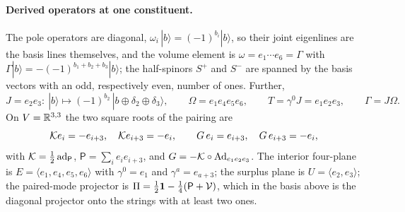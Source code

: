 \paragraph{Derived operators at one constituent.} The pole operators are diagonal, $\omega_i\,|b\rangle=(-1)^{b_i}|b\rangle$, so their joint eigenlines are the basis lines
themselves, and the volume element is $\omega=e_1\cdots e_6=\Gamma$ with $\Gamma|b\rangle=-(-1)^{b_1+b_2+b_3}|b\rangle$; the half-spinors $S^+$ and $S^-$ are spanned by the basis
vectors with an odd, respectively even, number of ones. Further,
\[
J=e_2e_3:\ |b\rangle\mapsto(-1)^{b_2}\,|b\oplus\delta_2\oplus\delta_3\rangle,\qquad \Omega=e_1e_4e_5e_6,\qquad T=\gamma^0J=e_1e_2e_3,\qquad \Gamma=J\Omega .
\]
On $V=\mathbb{R}^{3,3}$ the two square roots of the pairing are
\[
\mathcal K e_i=-e_{i+3},\quad \mathcal K e_{i+3}=-e_i,\qquad G\,e_i=e_{i+3},\quad G\,e_{i+3}=-e_i ,
\]
with $\mathcal K=\tfrac12\operatorname{ad}_{\mathsf P}$, $\mathsf P=\sum_ie_ie_{i+3}$, and $G=-\mathcal K\circ\operatorname{Ad}_{e_1e_2e_3}$. The interior four-plane is $E=\langle e_1,e_4,e_5,e_6\rangle$ with
$\gamma^0=e_1$ and $\gamma^a=e_{a+3}$; the surplus plane is $U=\langle e_2,e_3\rangle$; the paired-mode projector is $\Pi=\tfrac12\mathbf 1-\tfrac14(\mathsf P+\mathcal V)$, which in
the basis above is the diagonal projector onto the strings with at least two ones.

